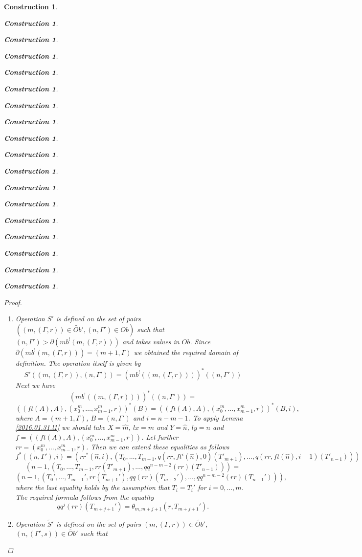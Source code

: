 \documentclass[12pt]{amsart}
\newenvironment{eq}{\begin{equation}}{\end{equation}}
\newtheorem{construction}[proposition]{Construction}
\newcommand{\llabel}[1]{\label{#1}}
\newcommand{\wt}{\widetilde}
\newcommand{\wh}{\widehat}
\begin{document}
\begin{construction}
\begin{construction}
\begin{construction}
\begin{construction}
\begin{construction}
\begin{construction}
\begin{construction}
\begin{construction}
\begin{construction}
\begin{construction}
\begin{construction}
\begin{construction}
\begin{construction}
\begin{construction}
\begin{construction}
\begin{construction}
\begin{construction}
\begin{construction}
\begin{proof}
\begin{enumerate}
To verify the formula for the operation itself consider the equalities:
%
$$\wt{T}'((m,\Gamma),(n,(\Gamma',s)))=mb(p_{(m,\Gamma)}^*(mb^!(n,(\Gamma',s))))=$$
$$mb(p_{(m,\Gamma)}^*((ft((n+1,\Gamma')),((n+1,\Gamma'),(x^{n}_0,\dots,x^{n}_{n-1},s))))),$$
%
where the first equality is by Definition \ref{2015.08.26.def1}(2). By Lemma
\ref{2015.09.03.l1} we can extend these equalities as follows:
%
$$mb(p_{(m,\Gamma)}^*((ft((n+1,\Gamma')),((n+1,\Gamma'),(x^{n}_0,\dots,x^{n}_{n-1},s)))))=$$
$$mb(p_{X}^*(ft(Y)),(p_{X}^*(Y),(x^{n+1}_0,\dots,x^{n+1}_{n},(qq^{n-m+1}(\iota^1_{m-1}))(s))))=$$
$$(n+1,(p_{X}^*(Y),\partial_{n}^{m-1}(s)))=(n+1,(T((m,\Gamma),(n+1,\Gamma')),\partial_n^{m-1}(s))),$$
%
where $X=(m,\Gamma)$, $Y=(n+1,\Gamma')$, the first equality is by Lemma
\ref{2015.09.03.l1}, the second by Lemma \ref{2015.08.26.l3a} and the third by
Definition \ref{2015.08.26.def1}(1).
%
\item Operation $S'$ is defined on the set of pairs $((m,(\Gamma,r))\in
  \wt{Ob}',(n,\Gamma')\in Ob)$ such that
  $(n,\Gamma')>\partial(mb^!(m,(\Gamma,r)))$ and takes values in $Ob$. Since
  $\partial(mb^!(m,(\Gamma,r)))=(m+1,\Gamma)$ we obtained the required domain
  of definition. The operation itself is given by
%
\begin{eq}\llabel{2016.01.21.eq2}
S'((m,(\Gamma,r)),(n,\Gamma'))=(mb^!((m,(\Gamma,r))))^*((n,\Gamma'))
\end{eq}%
%
Next we have 
%
$$(mb^!((m,(\Gamma,r))))^*((n,\Gamma'))=$$$$((ft(A),A),(x^{m}_0,\dots,x^{m}_{m-1},r))^*(B)=((ft(A),A),(x^{m}_0,\dots,x^{m}_{m-1},r))^*(B,i),$$
where $A=(m+1,\Gamma)$, $B=(n,\Gamma')$ and $i=n-m-1$. To apply Lemma
\ref{2016.01.31.l1} we should take $X=\wh{m}$, $lx=m$ and $Y=\wh{n}$, $ly=n$
and $f=((ft(A),A),(x^{m}_0,\dots,x^{m}_{m-1},r))$. Let further
$rr=(x^{m}_0,\dots,x^{m}_{m-1},r)$. Then we can extend these equalities as
follows
%
$$f^*((n,\Gamma'),i)=(rr^*(\wh{n},i),(T_0,\dots,T_{m-1},q(rr,ft^i(\wh{n}),0)(T'_{m+1}),\dots,q(rr,ft(\wh{n}),i-1)(T'_{n-1})))$$
$$(n-1,(T_0,\dots,T_{m-1},rr(T'_{m+1}),\dots,qq^{n-m-2}(rr)(T'_{n-1})))=$$
$$(n-1,(T_0',\dots,T_{m-1}',rr(T_{m+1}'),qq(rr)(T_{m+2}'),\dots,qq^{n-m-2}(rr)(T_{n-1}'))),$$
%
where the last equality holds by the assumption that $T_i=T_i'$ for $i=0,\dots,m$. 
The required formula follows from the equality 
%
$$qq^j(rr)(T_{m+j+1}')=\theta_{m,m+j+1}(r,T_{m+j+1}').$$
%
\item Operation $\wt{S}'$ is defined on the set of pairs $(m,(\Gamma,r))\in \wt{Ob}'$, $(n,(\Gamma',s))\in \wt{Ob}'$ such that 
%

\end{enumerate}
\end{proof}
\end{construction}
\end{construction}
\end{construction}
\end{construction}
\end{construction}
\end{construction}
\end{construction}
\end{construction}
\end{construction}
\end{construction}
\end{construction}
\end{construction}
\end{construction}
\end{construction}
\end{construction}
\end{construction}
\end{construction}
\end{construction}
\end{document}
